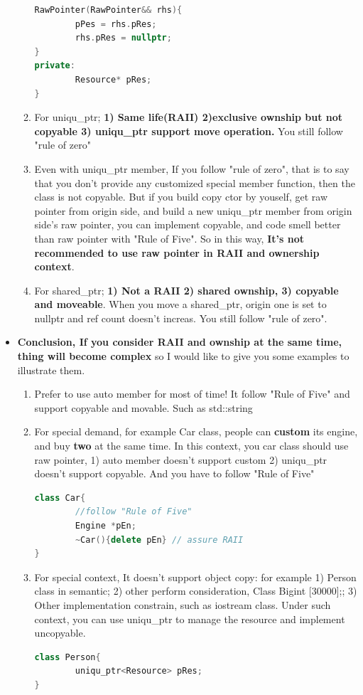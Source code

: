 \documentclass[a4paper,11pt,twoside]{book}
\begin{document}
\begin{itemize}
\begin{enumerate}
\begin{lstlisting}[frame=single, language=c++]
RawPointer(RawPointer&& rhs){
		pPes = rhs.pRes;
		rhs.pRes = nullptr;
}
private:
		Resource* pRes;
}
\end{lstlisting}
		
		\item For uniqu\_ptr; \textbf{1) Same life(RAII) 2)exclusive ownship but not copyable 3) uniqu\_ptr support move operation. } You still follow "rule of zero"
		
		\item Even with uniqu\_ptr member, If you follow "rule of zero", that is to say that you don't provide any customized special member function, then the class is not copyable. But if you build copy ctor by youself, get raw pointer from origin side, and build a new uniqu\_ptr member from origin side's raw pointer, you can implement copyable, and code smell better than raw pointer with "Rule of Five". So in this way, \textbf{It's not recommended to use raw pointer in RAII and ownership context}.
		
		\item For shared\_ptr; \textbf{1) Not a RAII 2) shared ownship, 3) copyable and moveable}. When you move a shared\_ptr, origin one is set to nullptr and ref count doesn't increas.  You still follow "rule of zero".
		
	\end{enumerate}
	
	\item \textbf{ Conclusion, If you consider RAII and ownship at the same time, thing will become complex}  so I would like to give you some examples to illustrate them.
	
	\begin{enumerate}
		\item Prefer to use auto member for most of time! It follow "Rule of Five" and support copyable and movable. Such as std::string
		
		\item  For special demand, for example Car class,  people can \textbf{custom} its engine, and buy \textbf{two} at the same time. In this context, you car class should use raw pointer, 1) auto member doesn't support custom 2) uniqu\_ptr doesn't support copyable.  And you have to follow "Rule of Five"
\begin{lstlisting}[frame=single, language=c++]
class Car{
		//follow "Rule of Five"
		Engine *pEn;
		~Car(){delete pEn} // assure RAII
}
\end{lstlisting}
		
		\item For special context, It doesn't support object copy: for example 1) Person class in semantic;  2) other  perform consideration, Class Big{int [30000];};  3) Other implementation constrain, such as iostream class.   Under such context, you can use uniqu\_ptr to manage the resource and implement uncopyable.
\begin{lstlisting}[frame=single, language=c++]
class Person{
		uniqu_ptr<Resource> pRes;
}
\end{lstlisting}
		

\end{enumerate}
\end{itemize}
\end{document}
